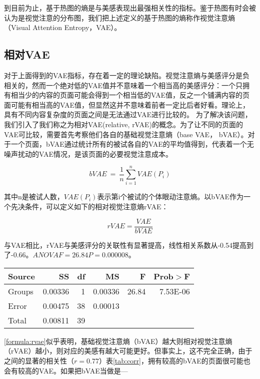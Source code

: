 到目前为止，基于热图的熵是与美感表现出最强相关性的指标。鉴于热图有时会被认为是视觉注意的分布图，我们把上述定义的基于热图的熵称作视觉注意熵（Visual Attention Entropy，VAE）。


\subsection{相对VAE}
对于上面得到的VAE指标，存在着一定的理论缺陷。视觉注意熵与美感评分是负相关的，然而一个绝对低的VAE值并不意味着一个相当高的美感评分：一个只拥有相当少的内容的页面可能会得到一个相当低的VAE值，反之一个铺满内容的页面可能有相当高的VAE值，但显然这并不意味着前者一定比后者好看。理论上，具有不同内容复杂度的页面之间是无法通过VAE进行比较的。
为了解决该问题，我们引入了我们称之为相对VAE(relative, rVAE)的概念。为了让不同的页面的VAE可比较，需要首先考察他们各自的基础视觉注意熵（base VAE， bVAE）。对于一个页面，bVAE通过统计所有的被试各自的VAE的平均值得到，代表着一个无噪声扰动的VAE情况，是该页面的必要视觉注意成本。

$$bVAE~=~\frac{1}{n}\sum_{i=1}^n VAE(P_i)$$

其中n是被试人数，$VAE(P_i)$表示第i个被试的个体眼动注意熵。以bVAE作为一个先决条件，可以定义如下的相对视觉注意熵rVAE：

\begin{equation}
rVAE = \frac{VAE}{bVAE}
\label{formula:rvae}
\end{equation}

与VAE相比，rVAE与美感评分的关联性有显著提高，线性相关系数从-0.54提高到了-0.66。$ANOVA F = 26.84 P = 0.000008$。

\begin{table}[H]
\centering
\begin{tabular}{lrrrrr}
  \hline
  Source&SS&df&MS&F&Prob$>$F\\ \hline
  Groups&0.00336&1&0.00336&26.84&7.53E-06\\
  Error&0.00475&38&0.00013&&\\
  Total&0.00811&39&&&\\
  \hline
\end{tabular}
\end{table}

\ref{formula:rvae}似乎表明，基础视觉注意熵（bVAE）越大则相对视觉注意熵（rVAE）越小，则对应的美感有越大可能更好。但事实上，这不完全正确，由于之间的显著的相关性（$r = 0.77$）表\ref{tab:corr}，拥有较高的bVAE的页面很可能也会有较高的VAE。如果把bVAE当做是---

